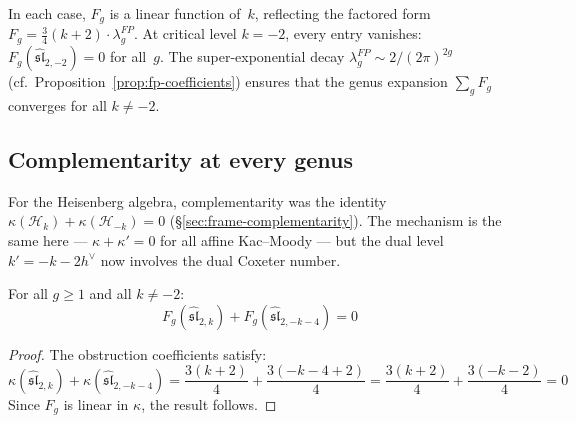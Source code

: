 \begin{computation}[Explicit values through \texorpdfstring{$g = 10$}{g = 10}]
\medskip
\noindent
In each case, $F_g$ is a linear function of~$k$, reflecting the factored form $F_g = \frac{3}{4}(k+2) \cdot \lambda_g^{FP}$.  At critical level $k = -2$, every entry vanishes: $F_g(\widehat{\mathfrak{sl}}_{2,-2}) = 0$ for all~$g$.  The super-exponential decay $\lambda_g^{FP} \sim 2/(2\pi)^{2g}$ (cf.\ Proposition~\ref{prop:fp-coefficients}) ensures that the genus expansion $\sum_g F_g$ converges for all $k \neq -2$.
\end{computation}

\subsection{Complementarity at every genus}\label{subsec:sl2-complementarity}

For the Heisenberg algebra, complementarity was the identity $\kappa(\mathcal{H}_k) + \kappa(\mathcal{H}_{-k}) = 0$ (\S\ref{sec:frame-complementarity}).  The mechanism is the same here --- $\kappa + \kappa' = 0$ for all affine Kac--Moody --- but the dual level $k' = -k - 2h^\vee$ now involves the dual Coxeter number.

\begin{proposition}\label{prop:sl2-complementarity-all-genera}
For all $g \geq 1$ and all $k \neq -2$:
\begin{equation}\label{eq:sl2-complementarity-allgenera}
F_g(\widehat{\mathfrak{sl}}_{2,k}) + F_g(\widehat{\mathfrak{sl}}_{2,-k-4}) = 0
\end{equation}
\end{proposition}

\begin{proof}
The obstruction coefficients satisfy:
\[
\kappa(\widehat{\mathfrak{sl}}_{2,k}) + \kappa(\widehat{\mathfrak{sl}}_{2,-k-4}) = \frac{3(k+2)}{4} + \frac{3(-k-4+2)}{4} = \frac{3(k+2)}{4} + \frac{3(-k-2)}{4} = 0
\]
Since $F_g$ is linear in $\kappa$, the result follows.
\end{proof}

